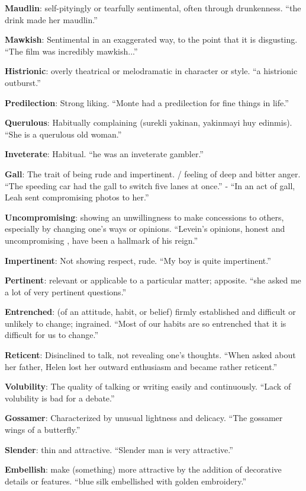 \documentclass[12pt, a4paper]{ximera}
\begin{document}
\textbf{Maudlin}: self-pityingly or tearfully sentimental, often through drunkenness. ``the drink made her maudlin.''

\textbf{Mawkish}: Sentimental in an exaggerated way, to the point that it is disgusting. ``The film was incredibly mawkish...''

\textbf{Histrionic}: overly theatrical or melodramatic in character or style. ``a histrionic outburst.''

\textbf{Predilection}: Strong liking. ``Monte had a predilection for fine things in life.''

\textbf{Querulous}: Habitually complaining (surekli yakinan, yakinmayi huy edinmis). ``She is a querulous old woman.''

\textbf{Inveterate}: Habitual. ``he was an inveterate gambler.''

\textbf{Gall}: The trait of being rude and impertinent. / feeling of deep and bitter anger. ``The speeding car had the gall to switch five lanes at once.'' - ``In an act of gall, Leah sent compromising photos to her.''

\textbf{Uncompromising}: showing an unwillingness to make concessions to others, especially by changing one's ways or opinions. ``Levein's opinions, honest and uncompromising , have been a hallmark of his reign.''

\textbf{Impertinent}: Not showing respect, rude. ``My boy is quite impertinent.''

\textbf{Pertinent}: relevant or applicable to a particular matter; apposite. ``she asked me a lot of very pertinent questions.''

\textbf{Entrenched}: (of an attitude, habit, or belief) firmly established and difficult or unlikely to change; ingrained. ``Most of our habits are so entrenched that it is difficult for us to change.''

\textbf{Reticent}: Disinclined to talk, not revealing one's thoughts. ``When asked about her father, Helen lost her outward enthusiasm and became rather reticent.''

\textbf{Volubility}: The quality of talking or writing easily and continuously. ``Lack of volubility is bad for a debate.''

\textbf{Gossamer}: Characterized by unusual lightness and delicacy. ``The gossamer wings of a butterfly.''

\textbf{Slender}: thin and attractive. ``Slender man is very attractive.''

\textbf{Embellish}: make (something) more attractive by the addition of decorative details or features. ``blue silk embellished with golden embroidery.''
\end{document}
